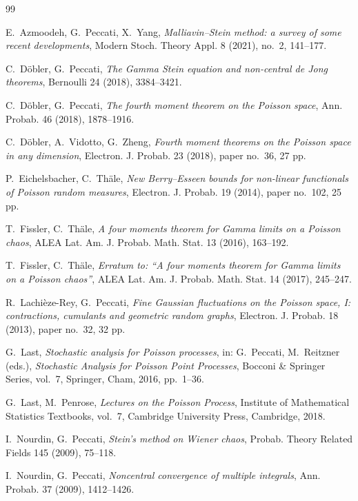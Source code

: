 \documentclass[letterpaper,11pt,reqno]{amsart}
\numberwithin{equation}{section}
\theoremstyle{plain}
\theoremstyle{definition}
\theoremstyle{remark}
\begin{document}
\begin{thebibliography}{99}

E.~Azmoodeh, G.~Peccati, X.~Yang,
\emph{Malliavin--Stein method: a survey of some recent developments},
Modern Stoch. Theory Appl. 8 (2021), no.~2, 141--177.


C.~D\"obler, G.~Peccati,
\emph{The Gamma Stein equation and non-central de Jong theorems},
Bernoulli 24 (2018), 3384--3421.

C.~D\"obler, G.~Peccati,
\emph{The fourth moment theorem on the Poisson space},
Ann. Probab. 46 (2018), 1878--1916.

C.~D\"obler, A.~Vidotto, G.~Zheng,
\emph{Fourth moment theorems on the Poisson space in any dimension},
Electron. J. Probab. 23 (2018), paper no.~36, 27 pp.

P.~Eichelsbacher, C.~Th\"ale,
\emph{New Berry--Esseen bounds for non-linear functionals of Poisson
random measures},
Electron. J. Probab. 19 (2014), paper no.~102, 25 pp.

T.~Fissler, C.~Th\"ale,
\emph{A four moments theorem for Gamma limits on a Poisson chaos},
ALEA Lat. Am. J. Probab. Math. Stat. 13 (2016), 163--192.

T.~Fissler, C.~Th\"ale,
\emph{Erratum to: ``A four moments theorem for Gamma limits on a
Poisson chaos''},
ALEA Lat. Am. J. Probab. Math. Stat. 14 (2017), 245--247.

R.~Lachi\`eze-Rey, G.~Peccati,
\emph{Fine Gaussian fluctuations on the Poisson space, I:
contractions, cumulants and geometric random graphs},
Electron. J. Probab. 18 (2013), paper no.~32, 32 pp.


G.~Last,
\emph{Stochastic analysis for Poisson processes},
in: G.~Peccati, M.~Reitzner (eds.),
\emph{Stochastic Analysis for Poisson Point Processes},
Bocconi \& Springer Series, vol.~7, Springer, Cham, 2016, pp.~1--36.

G.~Last, M.~Penrose,
\emph{Lectures on the Poisson Process},
Institute of Mathematical Statistics Textbooks, vol.~7,
Cambridge University Press, Cambridge, 2018.


I.~Nourdin, G.~Peccati,
\emph{Stein's method on Wiener chaos},
Probab. Theory Related Fields 145 (2009), 75--118.

I.~Nourdin, G.~Peccati,
\emph{Noncentral convergence of multiple integrals},
Ann. Probab. 37 (2009), 1412--1426.


\end{thebibliography}
\end{document}
